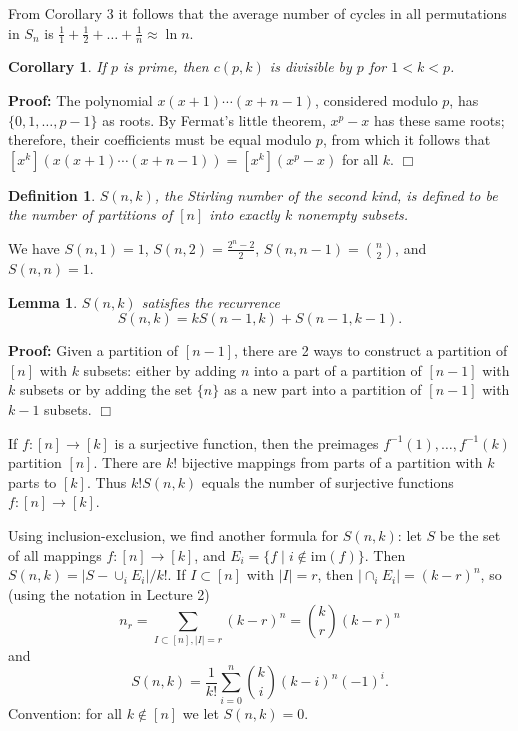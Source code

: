 \documentclass[11pt]{article}
\newtheorem{lemma}[theorem]{Lemma}
\newtheorem{corollary}[theorem]{Corollary}
\newtheorem{definition}[theorem]{Definition}
\newenvironment{proof}{\noindent \textbf{Proof:}}{$\Box$}
\begin{document}
From Corollary 3 it follows that the average number of cycles in all permutations in $S_n$ is 
$\frac{1}{1}+\frac{1}{2}+\ldots+\frac{1}{n}\approx \ln n$.

\begin{corollary}
    If $p$ is prime, then $c(p,k)$ is divisible by $p$ for $1<k<p$.
\end{corollary}
\begin{proof}
    The polynomial $x(x+1)\cdots(x+n-1)$, considered modulo $p$, has $\{0,1,\ldots,p-1\}$ as roots.
    By Fermat's little theorem, $x^p-x$ has these same roots; therefore, their coefficients must be 
    equal modulo $p$, from which it follows that $[x^k](x(x+1)\cdots(x+n-1)) = [x^k](x^p-x)$
    for all $k$.
\end{proof}

\begin{definition}
    $S(n,k)$, the Stirling number of the second kind, is defined to be the number 
    of partitions of $[n]$ into exactly $k$ nonempty subsets.
\end{definition}

We have $S(n,1)=1$, $S(n,2)=\frac{2^n-2}{2}$, $S(n,n-1)=\binom{n}{2}$, and $S(n,n)=1$.

\begin{lemma}
    $S(n,k)$ satisfies the recurrence
    \[S(n,k) = kS(n-1,k)+S(n-1,k-1).\]
\end{lemma}
\begin{proof}
    Given a partition of $[n-1]$, there are 2 ways to construct a partition 
    of $[n]$ with $k$ subsets: either by adding $n$ into a part of a partition of $[n-1]$ with $k$ subsets
    or by adding the set $\{n\}$ as a new part into a partition of $[n-1]$ with $k-1$ subsets. 
\end{proof}

If $f:[n]\to[k]$ is a surjective function, then the preimages $f^{-1}(1),\ldots,f^{-1}(k)$ partition $[n]$.
There are $k!$ bijective mappings from parts of a partition with $k$ parts to $[k]$. 
Thus $k!S(n,k)$ equals the number of surjective functions $f:[n]\to[k]$.

Using inclusion-exclusion, we find another formula for $S(n,k)$:
let $S$ be the set of all mappings $f:[n]\to [k]$, and $E_i=\{f\;|\;i\not\in\text{im}(f)\}$.
Then $S(n,k) = \left|S-\cup_{i}E_i\right| / k!$. If $I\subset [n]$ with $|I|=r$, then
$\left|\cap_i E_i\right| = (k-r)^n$, so (using the notation in Lecture 2) \[n_r=\sum_{I\subset [n],|I|=r} (k-r)^n = \binom{k}{r}(k-r)^n\]
and \[S(n,k) = \frac{1}{k!}\sum_{i=0}^n\binom{k}{i}(k-i)^n(-1)^i.\]
Convention: for all $k\not\in[n]$ we let $S(n,k) = 0$.
\end{document}
